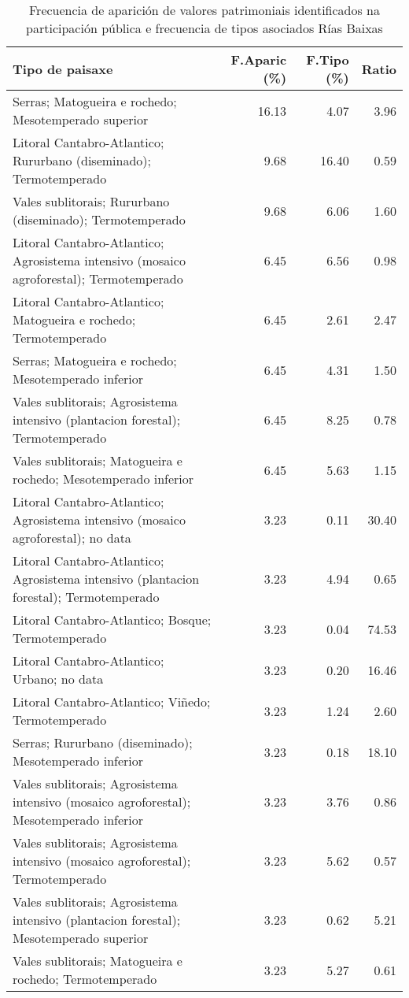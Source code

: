 \begin{table}[p]
\centering
\caption{Frecuencia de aparición de valores patrimoniais identificados na participación pública e frecuencia de tipos asociados Rías Baixas} 
\label{vsixotpat12}
\begin{tabular}{lrrr}
  \hline
Tipo de paisaxe & F.Aparic (\%) & F.Tipo (\%) & Ratio \\ 
  \hline
Serras; Matogueira e rochedo; Mesotemperado superior & 16.13 & 4.07 & 3.96 \\ 
  Litoral Cantabro-Atlantico; Rururbano (diseminado); Termotemperado & 9.68 & 16.40 & 0.59 \\ 
  Vales sublitorais; Rururbano (diseminado); Termotemperado & 9.68 & 6.06 & 1.60 \\ 
  Litoral Cantabro-Atlantico; Agrosistema intensivo (mosaico agroforestal); Termotemperado & 6.45 & 6.56 & 0.98 \\ 
  Litoral Cantabro-Atlantico; Matogueira e rochedo; Termotemperado & 6.45 & 2.61 & 2.47 \\ 
  Serras; Matogueira e rochedo; Mesotemperado inferior & 6.45 & 4.31 & 1.50 \\ 
  Vales sublitorais; Agrosistema intensivo (plantacion forestal); Termotemperado & 6.45 & 8.25 & 0.78 \\ 
  Vales sublitorais; Matogueira e rochedo; Mesotemperado inferior & 6.45 & 5.63 & 1.15 \\ 
  Litoral Cantabro-Atlantico; Agrosistema intensivo (mosaico agroforestal); no data & 3.23 & 0.11 & 30.40 \\ 
  Litoral Cantabro-Atlantico; Agrosistema intensivo (plantacion forestal); Termotemperado & 3.23 & 4.94 & 0.65 \\ 
  Litoral Cantabro-Atlantico; Bosque; Termotemperado & 3.23 & 0.04 & 74.53 \\ 
  Litoral Cantabro-Atlantico; Urbano; no data & 3.23 & 0.20 & 16.46 \\ 
  Litoral Cantabro-Atlantico; Viñedo; Termotemperado & 3.23 & 1.24 & 2.60 \\ 
  Serras; Rururbano (diseminado); Mesotemperado inferior & 3.23 & 0.18 & 18.10 \\ 
  Vales sublitorais; Agrosistema intensivo (mosaico agroforestal); Mesotemperado inferior & 3.23 & 3.76 & 0.86 \\ 
  Vales sublitorais; Agrosistema intensivo (mosaico agroforestal); Termotemperado & 3.23 & 5.62 & 0.57 \\ 
  Vales sublitorais; Agrosistema intensivo (plantacion forestal); Mesotemperado superior & 3.23 & 0.62 & 5.21 \\ 
  Vales sublitorais; Matogueira e rochedo; Termotemperado & 3.23 & 5.27 & 0.61 \\ 
   \hline
\end{tabular}
\end{table}
